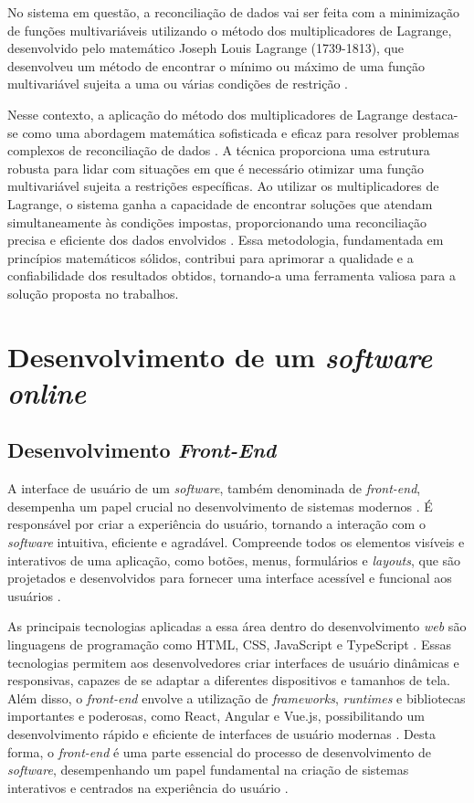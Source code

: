 No sistema em questão, a reconciliação de dados vai ser feita com a minimização de funções multivariáveis utilizando o método dos multiplicadores de Lagrange, desenvolvido pelo matemático Joseph Louis Lagrange (1739-1813), que desenvolveu um método de encontrar o mínimo ou máximo de uma função multivariável sujeita a uma ou várias condições de restrição \cite{lagrangebio}.
    
Nesse contexto, a aplicação do método dos multiplicadores de Lagrange destaca-se como uma abordagem matemática sofisticada e eficaz para resolver problemas complexos de reconciliação de dados \cite{optimizationlagrange}. A técnica proporciona uma estrutura robusta para lidar com situações em que é necessário otimizar uma função multivariável sujeita a restrições específicas. Ao utilizar os multiplicadores de Lagrange, o sistema ganha a capacidade de encontrar soluções que atendam simultaneamente às condições impostas, proporcionando uma reconciliação precisa e eficiente dos dados envolvidos \cite{aularecon}. Essa metodologia, fundamentada em princípios matemáticos sólidos, contribui para aprimorar a qualidade e a confiabilidade dos resultados obtidos, tornando-a uma ferramenta valiosa para a solução proposta no trabalhos.
        
\section{Desenvolvimento de um \textit{software online}}
\subsection{Desenvolvimento \textit{Front-End}}
    
A interface de usuário de um \textit{software}, também denominada de \textit{front-end}, desempenha um papel crucial no desenvolvimento de sistemas modernos \cite{eloquentjavascript}. É responsável por criar a experiência do usuário, tornando a interação com o \textit{software} intuitiva, eficiente e agradável. Compreende todos os elementos visíveis e interativos de uma aplicação, como botões, menus, formulários e \textit{layouts}, que são projetados e desenvolvidos para fornecer uma interface acessível e funcional aos usuários \cite{frontendperfomance}.
    
As principais tecnologias aplicadas a essa área dentro do desenvolvimento \textit{web} são linguagens de programação como HTML, CSS, JavaScript e TypeScript \cite{webdevlang}. Essas tecnologias permitem aos desenvolvedores criar interfaces de usuário dinâmicas e responsivas, capazes de se adaptar a diferentes dispositivos e tamanhos de tela. Além disso, o \textit{front-end} envolve a utilização de \textit{frameworks}, \textit{runtimes} e bibliotecas importantes e poderosas, como React, Angular e Vue.js, possibilitando um desenvolvimento rápido e eficiente de interfaces de usuário modernas \cite{frontendperfomance}. Desta forma, o \textit{front-end} é uma parte essencial do processo de desenvolvimento de \textit{software}, desempenhando um papel fundamental na criação de sistemas interativos e centrados na experiência do usuário \cite{reactjs}.

